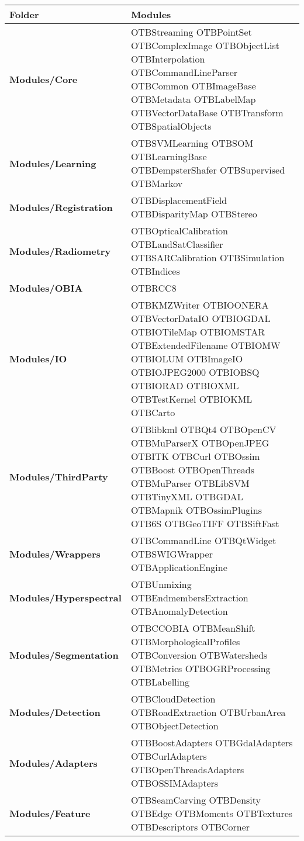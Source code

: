 \begin{center}
\begin{tiny}
\begin{table}[!htbp]
\begin{tabular}{|p{}|p{}|}
\hline
\textbf{Folder} & \textbf{Modules} \\
\hline
\textbf{Modules/Core} & OTBStreaming OTBPointSet OTBComplexImage OTBObjectList OTBInterpolation OTBCommandLineParser OTBCommon OTBImageBase OTBMetadata OTBLabelMap OTBVectorDataBase OTBTransform OTBSpatialObjects \\
\hline
\textbf{Modules/Learning} & OTBSVMLearning OTBSOM OTBLearningBase OTBDempsterShafer OTBSupervised OTBMarkov \\
\hline
\textbf{Modules/Registration} & OTBDisplacementField OTBDisparityMap OTBStereo \\
\hline
\textbf{Modules/Radiometry} & OTBOpticalCalibration OTBLandSatClassifier OTBSARCalibration OTBSimulation OTBIndices \\
\hline
\textbf{Modules/OBIA} & OTBRCC8 \\
\hline
\textbf{Modules/IO} & OTBKMZWriter OTBIOONERA OTBVectorDataIO OTBIOGDAL OTBIOTileMap OTBIOMSTAR OTBExtendedFilename OTBIOMW OTBIOLUM OTBImageIO OTBIOJPEG2000 OTBIOBSQ OTBIORAD OTBIOXML OTBTestKernel OTBIOKML OTBCarto \\
\hline
\textbf{Modules/ThirdParty} & OTBlibkml OTBQt4 OTBOpenCV OTBMuParserX OTBOpenJPEG OTBITK OTBCurl OTBOssim OTBBoost OTBOpenThreads OTBMuParser OTBLibSVM OTBTinyXML OTBGDAL OTBMapnik OTBOssimPlugins OTB6S OTBGeoTIFF OTBSiftFast \\
\hline
\textbf{Modules/Wrappers} & OTBCommandLine OTBQtWidget OTBSWIGWrapper OTBApplicationEngine \\
\hline
\textbf{Modules/Hyperspectral} & OTBUnmixing OTBEndmembersExtraction OTBAnomalyDetection \\
\hline
\textbf{Modules/Segmentation} & OTBCCOBIA OTBMeanShift OTBMorphologicalProfiles OTBConversion OTBWatersheds OTBMetrics OTBOGRProcessing OTBLabelling \\
\hline
\textbf{Modules/Detection} & OTBCloudDetection OTBRoadExtraction OTBUrbanArea OTBObjectDetection \\
\hline
\textbf{Modules/Adapters} & OTBBoostAdapters OTBGdalAdapters OTBCurlAdapters OTBOpenThreadsAdapters OTBOSSIMAdapters \\
\hline
\textbf{Modules/Feature} & OTBSeamCarving OTBDensity OTBEdge OTBMoments OTBTextures OTBDescriptors OTBCorner \\

\end{tabular}
\end{table}
\end{tiny}
\end{center}

